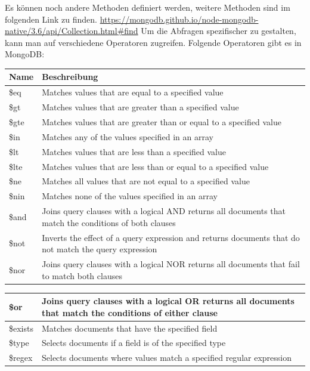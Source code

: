 \cite{mongodb_query_methods}
Es können noch andere Methoden definiert werden, weitere Methoden sind im folgenden Link zu finden.
\newline
\url{https://mongodb.github.io/node-mongodb-native/3.6/api/Collection.html#find}
\newline
Um die Abfragen spezifischer zu gestalten, kann man auf verschiedene Operatoren zugreifen. Folgende Operatoren gibt es in MongoDB:
\begin{center}
    \begin{tabular}{ | m{1.5cm} | m{13cm} | } 
        \hline
        Name & Beschreibung \\ [0.5ex] 
        \hline\hline
        \$eq & Matches values that are equal to a specified value \\
        \hline
        \$gt & Matches values that are greater than a specified value \\
        \hline
        \$gte & Matches values that are greater than or equal to a specified value \\
        \hline
        \$in & Matches any of the values specified in an array \\
        \hline
        \$lt & Matches values that are less than a specified value \\
        \hline
        \$lte & Matches values that are less than or equal to a specified value \\
        \hline
        \$ne & Matches all values that are not equal to a specified value \\
        \hline
        \$nin & Matches none of the values specified in an array \\
        \hline
        \$and & Joins query clauses with a logical AND returns all documents that match the conditions of both clauses \\
        \hline
        \$not & Inverts the effect of a query expression and returns documents that do not match the query expression \\
        \hline
        \$nor & Joins query clauses with a logical NOR returns all documents that fail to match both clauses \\
    \end{tabular}
\end{center}
\begin{center}
    \begin{tabular}{ | m{1.5cm} | m{13cm} | } 
        \$or & Joins query clauses with a logical OR returns all documents that match the conditions of either clause \\
        \hline
        \$exists & Matches documents that have the specified field \\
        \hline
        \$type & Selects documents if a field is of the specified type \\
        \hline
        \$regex & Selects documents where values match a specified regular expression \\
        \hline
    \end{tabular}
\end{center}
